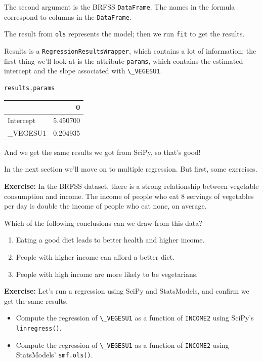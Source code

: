The second argument is the BRFSS \passthrough{\lstinline!DataFrame!}.
The names in the formula correspond to columns in the
\passthrough{\lstinline!DataFrame!}.

The result from \passthrough{\lstinline!ols!} represents the model; then
we run \passthrough{\lstinline!fit!} to get the results.

Results is a \passthrough{\lstinline!RegressionResultsWrapper!}, which
contains a lot of information; the first thing we'll look at is the
attribute \passthrough{\lstinline!params!}, which contains the estimated
intercept and the slope associated with
\passthrough{\lstinline!\_VEGESU1!}.

\begin{lstlisting}[]
results.params
\end{lstlisting}

\begin{tabular}{lr}
\midrule
{} &         0 \\
\midrule
Intercept &  5.450700 \\
\_VEGESU1  &  0.204935 \\
\midrule
\end{tabular}

And we get the same results we got from SciPy, so that's good!

In the next section we'll move on to multiple regression. But first,
some exercises.

\textbf{Exercise:} In the BRFSS dataset, there is a strong relationship
between vegetable consumption and income. The income of people who eat 8
servings of vegetables per day is double the income of people who eat
none, on average.

Which of the following conclusions can we draw from this data?

\begin{enumerate}
\def\labelenumi{\Alph{enumi}.}
\item
  Eating a good diet leads to better health and higher income.
\item
  People with higher income can afford a better diet.
\item
  People with high income are more likely to be vegetarians.
\end{enumerate}

\textbf{Exercise:} Let's run a regression using SciPy and StatsModels,
and confirm we get the same results.

\begin{itemize}
\item
  Compute the regression of \passthrough{\lstinline!\_VEGESU1!} as a
  function of \passthrough{\lstinline!INCOME2!} using SciPy's
  \passthrough{\lstinline!linregress()!}.
\item
  Compute the regression of \passthrough{\lstinline!\_VEGESU1!} as a
  function of \passthrough{\lstinline!INCOME2!} using StatsModels'
  \passthrough{\lstinline!smf.ols()!}.
\end{itemize}

